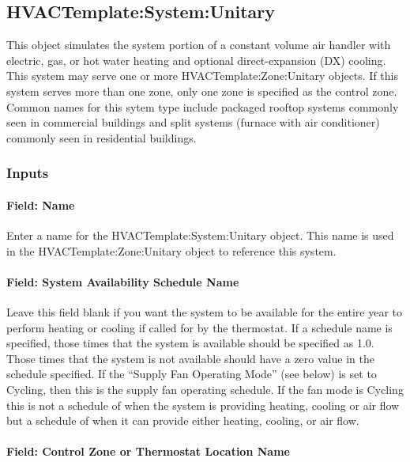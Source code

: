 \subsection{HVACTemplate:System:Unitary}\label{hvactemplatesystemunitary}

This object simulates the system portion of a constant volume air handler with electric, gas, or hot water heating and optional direct-expansion (DX) cooling. This system may serve one or more HVACTemplate:Zone:Unitary objects. If this system serves more than one zone, only one zone is specified as the control zone. Common names for this sytem type include packaged rooftop systems commonly seen in commercial buildings and split systems (furnace with air conditioner) commonly seen in residential buildings.

\subsubsection{Inputs}\label{inputs-15-005}

\paragraph{Field: Name}\label{field-name-2-019}

Enter a name for the HVACTemplate:System:Unitary object. This name is used in the HVACTemplate:Zone:Unitary object to reference this system.

\paragraph{Field: System Availability Schedule Name}\label{field-system-availability-schedule-name-7}

Leave this field blank if you want the system to be available for the entire year to perform heating or cooling if called for by the thermostat. If a schedule name is specified, those times that the system is available should be specified as 1.0. Those times that the system is not available should have a zero value in the schedule specified. If the ``Supply Fan Operating Mode'' (see below) is set to Cycling, then this is the supply fan operating schedule. If the fan mode is Cycling this is not a schedule of when the system is providing heating, cooling or air flow but a schedule of when it can provide either heating, cooling, or air flow.

\paragraph{Field: Control Zone or Thermostat Location Name}\label{field-control-zone-or-thermostat-location-name}

